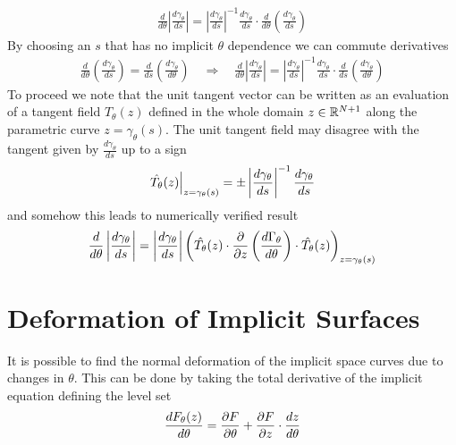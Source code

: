 \begin{align}
    \frac{d}{d\theta}\left|\frac{d\gamma_{\theta}}{ds}\right|=
    \left|\frac{d\gamma_{\theta}}{ds}\right|^{-1}
    \frac{d\gamma_{\theta}}{ds}\cdot\frac{d}{d\theta}
    \left(\frac{d\gamma_{\theta}}{ds}\right)
\end{align}
By choosing an $s$ that has no implicit $\theta$ dependence we can commute derivatives
\begin{align}
    \frac{d}{d\theta}\left(\frac{d\gamma_{\theta}}{ds}\right)
    = \frac{d}{ds}\left(\frac{d\gamma_{\theta}}{d\theta}\right)
    \quad\Rightarrow\quad
    \frac{d}{d\theta}\left|\frac{d\gamma_{\theta}}{ds}\right|=
    \left|\frac{d\gamma_{\theta}}{ds}\right|^{-1}
    \frac{d\gamma_{\theta}}{ds}\cdot\frac{d}{d s}
    \left(\frac{d\gamma_{\theta}}{d\theta}\right)
\end{align}
To proceed we note that the unit tangent vector can be written as an evaluation of a tangent field $\hat{T}_{\theta}(z)$ defined in the whole domain $z\in\mathbb{R}^{N+1}$ along the parametric curve $z=\gamma_{\theta}(s)$. The unit tangent field may disagree with the tangent given by $\frac{d\gamma_{\theta}}{ds}$ up to a sign
\begin{align}
    \left.\hat{T_{\theta}}(z)\right|_{z=\gamma_{\theta}(s)}=
    \pm\left|\frac{d\gamma_{\theta}}{ds}\right|^{-1}\frac{d\gamma_{\theta}}{d s}
\end{align}
and somehow this leads to numerically verified result
\begin{align}
    \frac{d}{d\theta}\left|\frac{d\gamma_{\theta}}{ds}\right|=
    \left|\frac{d\gamma_{\theta}}{ds}\right|\left(
   \hat{T_{\theta}}(z)\cdot\frac{\partial }{\partial z}\left(\frac{d\Gamma_{\theta}}{d \theta}\right)\cdot
   \hat{T_{\theta}}(z)
    \right)_{z=\gamma_\theta(s)}
    \label{eq:divergence-term}
\end{align}

\section{Deformation of Implicit Surfaces}
\label{appendix:deformation}
It is possible to find the normal deformation of the implicit space curves due to changes in $\theta$. This can be done by taking the total derivative of the implicit equation defining the level set
\begin{align}
    \frac{dF_{\theta}(z)}{d\theta}=\frac{\partial F}{\partial\theta}+
    \frac{\partial F}{\partial z}\cdot\frac{d z}{d \theta}
\end{align}

